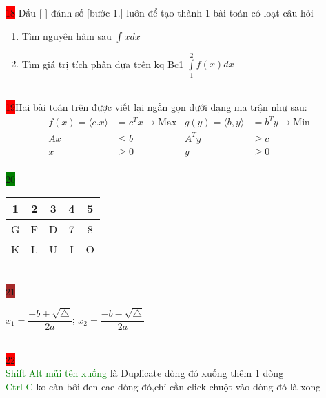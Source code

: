 \documentclass{article}
\begin{document}
\colorbox{red}{18}  Dấu [ ] đánh số [bước 1.] luôn để tạo thành 1 bài toán có loạt câu hỏi
\begin{enumerate}[Bước 1.]
\item Tìm nguyên hàm sau $\displaystyle\int xdx $
\item Tìm giá trị tích phân dựa trên kq Bc1 $\displaystyle\int\limits_1^2f(x)dx$
\end{enumerate}\\

\colorbox{red}{19}\quad Hai bài toán trên được viết lại ngắn gọn dưới dạng ma trận như sau:
\begin{align*}
       f(x) =\langle c.x \rangle&= c^Tx \longrightarrow \text{Max}   & g(y) =\langle b,y \rangle&= b^Ty \longrightarrow \text{Min}\\
      Ax &\leq b & A^Ty &\geq c \\
     x &\geq 0 &  y &\geq 0
\end{align*}\\

\colorbox{green}{20}\\

             \begin{tabular}{|c|c|c|c|c|}
                \hline %
                \rowcolor{pink} 1 & 2 & 3 & 4 & 5 \\ %
                \hline %
                \cellcolor{yellow} G & F & D & 7 & 8 \\ %
                \hline
                K & L & \cellcolor{red} U & I & O \\ %


             \end{tabular}\\




\colorbox{brown}{21} \\
\begin{center}
\color{red} $ x_1= \dfrac{-b+  \sqrt\triangle}{2a}$;\quad
\color{red} $x_2 = \dfrac{-b-\sqrt\triangle}{2a}$
\end{center}\\

\colorbox{red}{22}\\

\textcolor{green}{Shift Alt mũi tên xuống} là Duplicate dòng đó xuống thêm 1 dòng\\
\textcolor{green}{Ctrl C} ko càn bôi đen cae dòng đó,chỉ cần click chuột vào dòng đó là xong\\
 
\end{document}
